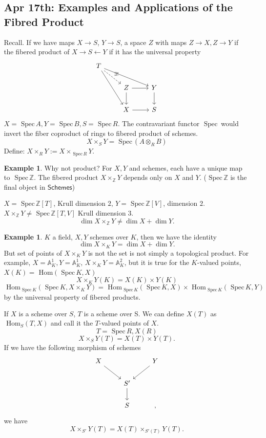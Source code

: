 \documentclass[11pt]{article}
\theoremstyle{definition}
\newtheorem{ex}[thm]{Example}
\renewcommand{\hom}{\text{ Hom}}
\newcommand{\spec}{\text{ Spec}\,}
\newcommand{\affn}{\mathbb A}
\newcommand{\intg}{\mathbb Z}
\newcommand{\lrta}{\longrightarrow}
\begin{document}
\subsection{Apr 17th: Examples and Applications of the Fibred Product}
Recall.
If we have maps
 $X\lrta S$, $Y\lrta S$, a space $Z$ with maps $Z\lrta X, Z\lrta Y$ if the fibered product of $X\lrta S\longleftarrow Y$ if it has the universal property
 $$
\begin{tikzcd}
T \arrow[rdd] \arrow[rrd] \arrow[rd, "\exists!", dashed] &  &  \\
 & Z \arrow[d] \arrow[r] & Y \arrow[d] \\
 & X \arrow[r] & S
\end{tikzcd}
 $$
 $X=\spec A, Y=\spec B, S=\spec R$. The contravariant functor $\spec$ would invert the fiber coproduct of rings to fibered product of schemes.
 $$
X\times_S Y=\spec( A\otimes_R B)
 $$
 Define: $X\times_R Y:=X\times_{\spec R} Y$.

\begin{ex}
Why not product?
For $X,Y$ and schemes, each have a unique map to $\spec \intg$. The fibered product $X\times_\intg Y$ depends only on $X$ and $Y$. ($\spec \intg$ is the final object in $\mathsf{Schemes}$)

$X=\spec \intg[T]$, Krull dimension $2$, $Y=\spec \intg[V]$, dimension $2$. $X\times_\intg Y\neq\spec \intg[T,V]$ Krull dimension $3$.
$$
\dim X\times_\intg Y\neq \dim X+\dim Y.
$$
\end{ex}

\begin{ex}
$K$ a field, $X, Y$ schemes over $K$, then we have the identity
 $$\dim X\times_K Y=\dim X+\dim Y.$$ But  set of points of $X\times_K Y$ is not the set is not simply a topological product. For example, $X=\affn^1_K, Y=\affn^1_K$, $X\times_K Y=\affn^2_K$, but it  is true for the $K$-valued points,  $X(K)=\hom(\spec K, X)$
$$
X\times_K Y(K)=X(K)\times Y(K)
$$
$$
\hom_{\spec K}(\spec K, X\times_K Y)=\hom_{\spec K}(\spec K, X)\times \hom_{\spec K}(\spec K, Y)
$$
by the universal property of fibered products.
\end{ex}

If $X$ is a scheme over $S$, $T$ is a scheme over S. We can define $X(T)$ as $\hom_S(T,X)$
and call it the $T$-valued points of $X$.
$$
T=\spec R, X(R)
$$
$$
X\times_S Y(T)=X(T)\times Y(T).
$$
If we have the following morphism of schemes
$$
\begin{tikzcd}
X \arrow[rd] &  & Y \arrow[ld] \\
 & S' \arrow[d] &  \\
 & S &, 
\end{tikzcd}
$$
 we have 
 $$
X\times_{S'} Y(T)=X(T)\times_{S'(T)} Y(T).
 $$
\end{document}
